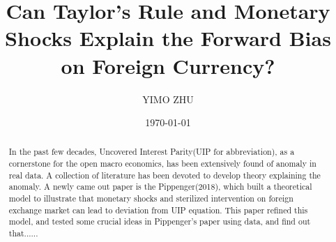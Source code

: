 \documentclass[12pt]{article}
\begin{document}
    \title{Can Taylor's Rule and Monetary Shocks Explain the Forward Bias on Foreign Currency?}
    \author{\textsc{YIMO ZHU}}
    \date{\today}
    \maketitle
\begin{abstract}
In the past few decades, Uncovered Interest Parity(UIP for abbreviation), as a cornerstone for the open macro economics, has been extensively found of anomaly in real data. A collection of literature has been devoted to develop theory explaining the anomaly. A newly came out paper is the Pippenger(2018), which built a theoretical model to illustrate that monetary shocks and sterilized intervention on foreign exchange market can lead to deviation from UIP equation. This paper refined this model, and tested some crucial ideas in Pippenger's paper using data, and find out that......
\end{abstract}
\end{document}
